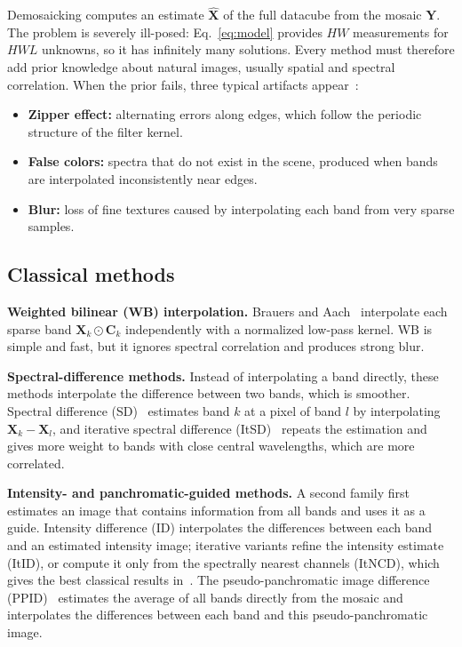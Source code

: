 \documentclass{article}
\def\X{{\mathbf X}}
\def\Y{{\mathbf Y}}
\def\C{{\mathbf C}}
\begin{document}
Demosaicking computes an estimate $\hat\X$ of the full datacube from the
mosaic $\Y$. The problem is severely ill-posed: Eq.~\eqref{eq:model} provides
$HW$ measurements for $HWL$ unknowns, so it has infinitely many solutions.
Every method must therefore add prior knowledge about natural images, usually
spatial and spectral correlation. When the prior fails, three typical
artifacts appear~\cite{diaz2023}:
\begin{itemize}
  \item \textbf{Zipper effect:} alternating errors along edges, which follow
        the periodic structure of the filter kernel.
  \item \textbf{False colors:} spectra that do not exist in the scene,
        produced when bands are interpolated inconsistently near edges.
  \item \textbf{Blur:} loss of fine textures caused by interpolating each
        band from very sparse samples.
\end{itemize}

\subsection{Classical methods}

\textbf{Weighted bilinear (WB) interpolation.} Brauers and
Aach~\cite{brauers2006} interpolate each sparse band $\X_k\odot\C_k$
independently with a normalized low-pass kernel. WB is simple and fast, but
it ignores spectral correlation and produces strong blur.

\textbf{Spectral-difference methods.} Instead of interpolating a band
directly, these methods interpolate the difference between two bands, which
is smoother. Spectral difference (SD)~\cite{brauers2006} estimates band $k$ at
a pixel of band $l$ by interpolating $\X_k-\X_l$, and iterative spectral
difference (ItSD)~\cite{mizutani2014} repeats the estimation and gives more
weight to bands with close central wavelengths, which are more correlated.

\textbf{Intensity- and panchromatic-guided methods.} A second family first
estimates an image that contains information from all bands and uses it as a
guide. Intensity difference (ID) interpolates the differences between each
band and an estimated intensity image; iterative variants refine the intensity
estimate (ItID), or compute it only from the spectrally nearest channels
(ItNCD), which gives the best classical results in~\cite{diaz2023}. The
pseudo-panchromatic image difference (PPID)~\cite{mihoubi2017} estimates the
average of all bands directly from the mosaic and interpolates the
differences between each band and this pseudo-panchromatic image.
\end{document}
